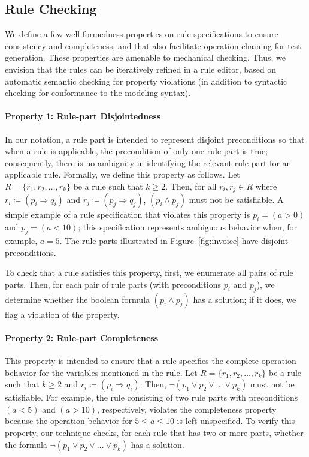 \subsection{Rule Checking}
\label{sec:checking}
 
We define a few well-formedness properties on rule specifications to ensure
consistency and completeness, and that also facilitate operation chaining for
test generation. These properties are amenable to mechanical checking. Thus, we
envision that the rules can be iteratively refined in a rule editor, based on
automatic semantic checking for property violations (in addition to syntactic
checking for conformance to the modeling syntax).

\vspace*{-5pt}
\paragraph*{Property 1: Rule-part Disjointedness}
In our notation, a rule part is intended to represent disjoint preconditions so
that when a rule is applicable, the precondition of only one rule part is true;
consequently, there is no ambiguity in identifying the relevant rule part for an
applicable rule. Formally, we define this property as follows. Let $R= \{r_1,
r_2, \ldots, r_k\}$ be a rule such that $k \geq 2$. Then, for all $r_i, r_j \in
R$ where $ r_i \coloneqq (p_i \Longrightarrow q_i)$ and $r_j \coloneqq (p_j
\Longrightarrow q_j)$, $(p_i \wedge p_j)$ must not be satisfiable. A simple
example of a rule specification that violates this property is $p_i = (a > 0)$
and $p_j = (a < 10)$; this specification represents ambiguous behavior when, for
example, $a = 5$.  The rule parts illustrated in Figure~\ref{fig:invoice} have
disjoint preconditions.

To check that a rule satisfies this property, first, we enumerate all pairs of
rule parts. Then, for each pair of rule parts (with preconditions $p_i$ and
$p_j$), we determine whether the boolean formula $(p_i \wedge p_j)$ has a
solution; if it does, we flag a violation of the property.

\vspace*{-5pt}
\paragraph*{Property 2: Rule-part Completeness}
This property is intended to ensure that a rule specifies the complete operation
behavior for the variables mentioned in the rule. Let $R= \{r_1, r_2, \ldots,
r_k\}$ be a rule such that $k \geq 2$ and $r_i \coloneqq (p_i \Longrightarrow
q_i)$. Then, $\neg(p_1 \vee p_2 \vee \ldots \vee p_k)$ must not be
satisfiable. For example, the rule consisting of two rule parts with
preconditions $(a < 5)$ and $(a > 10)$, respectively, violates the completeness
property because the operation behavior for $5 \leq a \leq 10$ is left
unspecified.  To verify this property, our technique checks, for each rule that
has two or more parts, whether the formula $\neg(p_1 \vee p_2 \vee \ldots \vee
p_k)$ has a solution.

